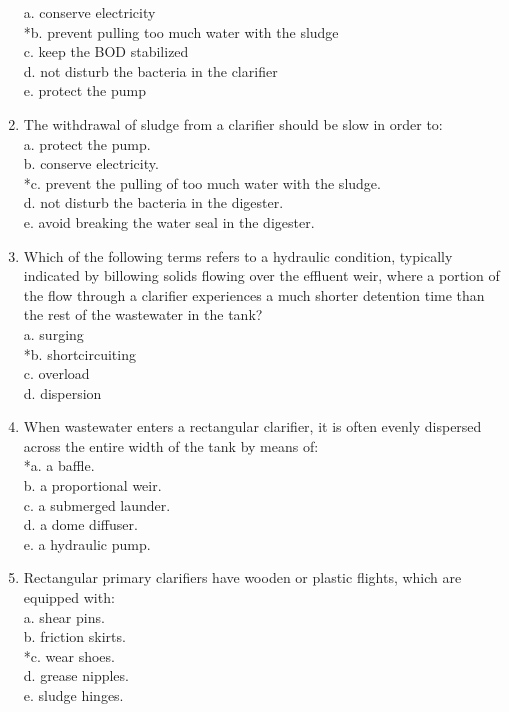 \begin{enumerate}
a. conserve electricity \\
*b. prevent pulling too much water with the sludge \\
c. keep the BOD stabilized \\
d. not disturb the bacteria in the clarifier \\
e. protect the pump \\


\item  The withdrawal of sludge from a clarifier should be slow in order to: \\

a. protect the pump. \\
b. conserve electricity. \\
*c. prevent the pulling of too much water with the sludge. \\
d. not disturb the bacteria in the digester. \\
e. avoid breaking the water seal in the digester. \\


\item  Which of the following terms refers to a hydraulic condition, typically indicated by billowing solids flowing over the effluent weir, where a portion of the flow through a clarifier experiences a much shorter detention time than the rest of the wastewater in the tank? \\

a. surging \\
*b. shortcircuiting \\
c. overload \\
d. dispersion \\


\item  When wastewater enters a rectangular clarifier, it is often evenly dispersed across the entire width of the tank by means of: \\

*a. a baffle. \\
b. a proportional weir. \\
c. a submerged launder. \\
d. a dome diffuser. \\
e. a hydraulic pump. \\


\item  Rectangular primary clarifiers have wooden or plastic flights, which are equipped with: \\

a. shear pins. \\
b. friction skirts. \\
*c. wear shoes. \\
d. grease nipples. \\
e. sludge hinges. \\



\end{enumerate}

